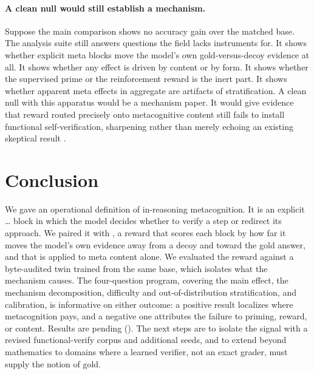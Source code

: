 \paragraph{A clean null would still establish a mechanism.}
Suppose the main comparison shows no accuracy gain over the matched base. The
analysis suite still answers questions the field lacks instruments for. It shows
whether explicit meta blocks move the model's own gold-versus-decoy evidence at
all. It shows whether any effect is driven by content or by form. It shows
whether the supervised prime or the reinforcement reward is the inert part. It
shows whether apparent meta effects in aggregate are artifacts of
stratification. A clean null with this apparatus would be a mechanism paper. It
would give evidence that reward routed precisely onto metacognitive content
still fails to install functional self-verification, sharpening rather than
merely echoing an existing skeptical result \citep{huang2024llmcannot}.

\section{Conclusion}
\label{sec:conclusion}
We gave an operational definition of in-reasoning metacognition. It is an
explicit \metaopen{}\dots\metaclose{} block in which the model decides whether to
verify a step or redirect its approach. We paired it with \pmishift{}, a reward
that scores each block by how far it moves the model's own evidence away from a
decoy and toward the gold answer, and that is applied to meta content alone. We
evaluated the reward against a byte-audited twin trained from the same base,
which isolates what the mechanism causes. The four-question program, covering the
main effect, the mechanism decomposition, difficulty and out-of-distribution
stratification, and calibration, is informative on either outcome: a positive
result localizes where metacognition pays, and a negative one attributes the
failure to priming, reward, or content. Results are pending
(). The next steps are to isolate the
\pmishift{} signal with a revised functional-verify corpus and additional seeds,
and to extend beyond mathematics to domains where a learned verifier, not an
exact grader, must supply the notion of gold.
